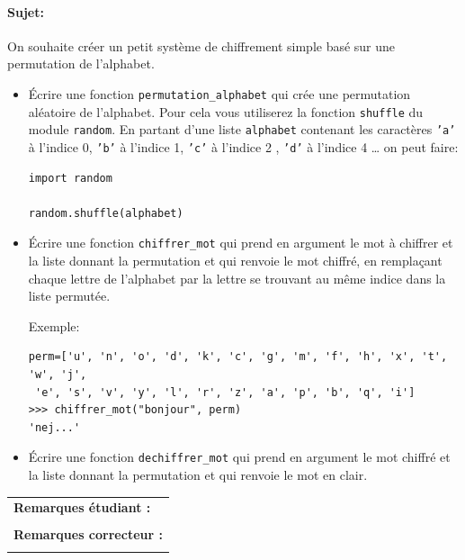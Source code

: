 \documentclass[a4paper,11pt]{article}
\begin{document}
\paragraph*{Sujet:} On souhaite créer un petit système de chiffrement simple basé sur une permutation de l’alphabet.

\begin{itemize}
\item[1.] Écrire une fonction \texttt{permutation\_alphabet} qui 
crée une permutation aléatoire de l’alphabet. Pour cela vous utiliserez la fonction
\texttt{shuffle} du module \texttt{random}. 
En partant d'une liste \texttt{alphabet} contenant les caractères \texttt{'a'} à l'indice 0, \texttt{'b'} à l'indice 1, \texttt{'c'} à l'indice 2 , \texttt{'d'} à l'indice 4  \ldots 
on peut faire: 
\begin{verbatim}
import random

random.shuffle(alphabet)
\end{verbatim}
\item[2.]  Écrire une fonction \texttt{chiffrer\_mot} 
qui prend en argument le mot à chiffrer  et la liste donnant la permutation et 
qui renvoie le mot chiffré, en remplaçant chaque lettre de l'alphabet par la lettre se trouvant au même indice dans la liste permutée. \\
\vspace{-0.1 cm}

Exemple: 
\vspace{-0.2 cm}
\begin{verbatim}
perm=['u', 'n', 'o', 'd', 'k', 'c', 'g', 'm', 'f', 'h', 'x', 't', 'w', 'j',
 'e', 's', 'v', 'y', 'l', 'r', 'z', 'a', 'p', 'b', 'q', 'i']
>>> chiffrer_mot("bonjour", perm)
'nej...'
\end{verbatim}

\item[3.]  Écrire une fonction \texttt{dechiffrer\_mot} 
qui prend en argument le mot chiffré et la liste donnant la permutation et 
qui renvoie le mot en clair. 
\end{itemize}


\vspace{-0.4 cm}

\begin{table}[h!]
\centering
\renewcommand{\arraystretch}{1.4} %
\begin{tabular}{|p{15cm}|}
\hline
\textbf{Remarques étudiant :}    \\
 \\
\hline
\textbf{Remarques correcteur :}  \\
 \\
\hline
\end{tabular}
\end{table}
\end{document}
